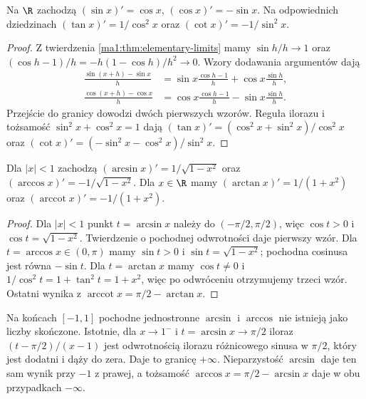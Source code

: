 \begin{twierdzenie}
\label{ma1:thm:trig-derivatives}
Na $\R$ zachodzą $(\sin x)'=\cos x$, $(\cos x)'=-\sin x$. Na odpowiednich dziedzinach
$(\tan x)'=1/\cos^2x$ oraz $(\cot x)'=-1/\sin^2x$.
\end{twierdzenie}
\begin{proof}
Z twierdzenia \ref{ma1:thm:elementary-limits} mamy $\sin h/h\to1$ oraz $(\cos h-1)/h=-h(1-\cos h)/h^2\to0$. Wzory dodawania argumentów dają
\begin{align*}
 \frac{\sin(x+h)-\sin x}{h}
 &=\sin x\frac{\cos h-1}h+\cos x\frac{\sin h}h,\\
 \frac{\cos(x+h)-\cos x}{h}
 &=\cos x\frac{\cos h-1}h-\sin x\frac{\sin h}h.
\end{align*}
Przejście do granicy dowodzi dwóch pierwszych wzorów. Reguła ilorazu i tożsamość $\sin^2x+\cos^2x=1$ dają
$(\tan x)'=(\cos^2x+\sin^2x)/\cos^2x$ oraz
$(\cot x)'=(-\sin^2x-\cos^2x)/\sin^2x$.
\end{proof}
\begin{twierdzenie}
\label{ma1:thm:inverse-trig-derivatives}
Dla $|x|<1$ zachodzą
$(\arcsin x)'=1/\sqrt{1-x^2}$ oraz
$(\arccos x)'=-1/\sqrt{1-x^2}$.
Dla $x\in\R$ mamy $(\arctan x)'=1/(1+x^2)$ oraz
$(\operatorname{arccot}x)'=-1/(1+x^2)$.
\end{twierdzenie}
\begin{proof}
Dla $|x|<1$ punkt $t=\arcsin x$ należy do $(-\pi/2,\pi/2)$, więc $\cos t>0$ i $\cos t=\sqrt{1-x^2}$. Twierdzenie o pochodnej odwrotności daje pierwszy wzór. Dla $t=\arccos x\in(0,\pi)$ mamy $\sin t>0$ i $\sin t=\sqrt{1-x^2}$; pochodna cosinusa jest równa $-\sin t$. Dla $t=\arctan x$ mamy $\cos t\ne0$ i $1/\cos^2t=1+\tan^2t=1+x^2$, więc po odwróceniu otrzymujemy trzeci wzór. Ostatni wynika z $\operatorname{arccot}x=\pi/2-\arctan x$.
\end{proof}
Na końcach $[-1,1]$ pochodne jednostronne $\arcsin$ i $\arccos$ nie istnieją jako liczby skończone. Istotnie, dla $x\to1^-$ i $t=\arcsin x\to\pi/2$ iloraz $(t-\pi/2)/(x-1)$ jest odwrotnością ilorazu różnicowego sinusa w $\pi/2$, który jest dodatni i dąży do zera. Daje to granicę $+\infty$. Nieparzystość $\arcsin$ daje ten sam wynik przy $-1$ z prawej, a tożsamość $\arccos x=\pi/2-\arcsin x$ daje w obu przypadkach $-\infty$.

